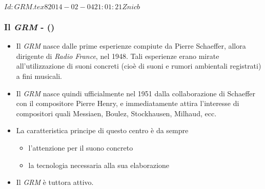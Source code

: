 %
%
\svnInfo $Id: GRM.tex 8 2014-02-04 21:01:21Z nicb $

\setcounter{ms}{0}
\begin{frame}
    \frametitle{Il \emph{GRM} - ()}

    \begin{itemize}

    \item Il \emph{GRM} nasce dalle prime esperienze compiute da Pierre Schaeffer,
        allora dirigente di \emph{Radio France}, nel 1948.
        Tali esperienze erano mirate all'utilizzazione di suoni concreti
        (cio\`e di suoni e rumori ambientali registrati) a fini musicali.

    \item Il \emph{GRM} nasce quindi ufficialmente nel 1951
        dalla collaborazione di Schaeffer con il compositore Pierre Henry,
        e immediatamente attira l'interesse di compositori quali
        Messiaen, Boulez, Stockhausen, Milhaud, ecc.

    \item La caratteristica principe di questo centro \`e da sempre

        \begin{itemize}

            \item l'attenzione per il suono concreto

            \item la tecnologia necessaria alla sua elaborazione

        \end{itemize}

    \item Il \emph{GRM} \`e tuttora attivo.

    \end{itemize}

\end{frame}

